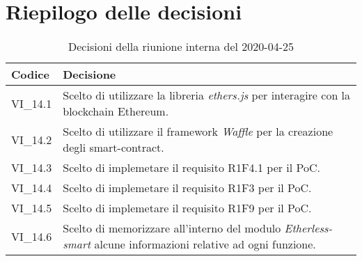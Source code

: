 \section{Riepilogo delle decisioni}
\begin{longtable}{ 
	 >{\centering}p{} >{}p{} }
	
	\caption{Decisioni della riunione interna del 2020-04-25}\\	
	
	\textbf{\color{white}Codice} & 
	\textbf{\color{white}Decisione} 
	\tabularnewline  
	\endhead
	
	VI\_14.1 & Scelto di utilizzare la libreria \textit{ethers.js} per interagire con la blockchain Ethereum. \\
	VI\_14.2 & Scelto di utilizzare il framework \textit{Waffle} per la creazione degli smart-contract. \\
	VI\_14.3 & Scelto di implemetare il requisito R1F4.1 per il PoC. \\
	VI\_14.4 & Scelto di implemetare il requisito R1F3 per il PoC. \\
	VI\_14.5 & Scelto di implemetare il requisito R1F9 per il PoC. \\	
	VI\_14.6 & Scelto di memorizzare all'interno del modulo \textit{Etherless-smart} alcune informazioni relative ad ogni funzione. \\
	

\end{longtable}
